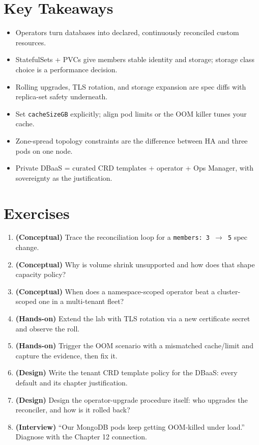 \section*{Key Takeaways}
\begin{itemize}
    \item Operators turn databases into declared, continuously reconciled custom resources.
    \item StatefulSets + PVCs give members stable identity and storage; storage class choice is a performance decision.
    \item Rolling upgrades, TLS rotation, and storage expansion are spec diffs with replica-set safety underneath.
    \item Set \texttt{cacheSizeGB} explicitly; align pod limits or the OOM killer tunes your cache.
    \item Zone-spread topology constraints are the difference between HA and three pods on one node.
    \item Private DBaaS = curated CRD templates + operator + Ops Manager, with sovereignty as the justification.
\end{itemize}

\section{Exercises}
\begin{enumerate}
    \item \textbf{(Conceptual)} Trace the reconciliation loop for a \texttt{members: 3 $\to$ 5} spec change.
    \item \textbf{(Conceptual)} Why is volume shrink unsupported and how does that shape capacity policy?
    \item \textbf{(Conceptual)} When does a namespace-scoped operator beat a cluster-scoped one in a multi-tenant fleet?
    \item \textbf{(Hands-on)} Extend the lab with TLS rotation via a new certificate secret and observe the roll.
    \item \textbf{(Hands-on)} Trigger the OOM scenario with a mismatched cache/limit and capture the evidence, then fix it.
    \item \textbf{(Design)} Write the tenant CRD template policy for the DBaaS: every default and its chapter justification.
    \item \textbf{(Design)} Design the operator-upgrade procedure itself: who upgrades the reconciler, and how is it rolled back?
    \item \textbf{(Interview)} ``Our MongoDB pods keep getting OOM-killed under load.'' Diagnose with the Chapter 12 connection.
\end{enumerate}

